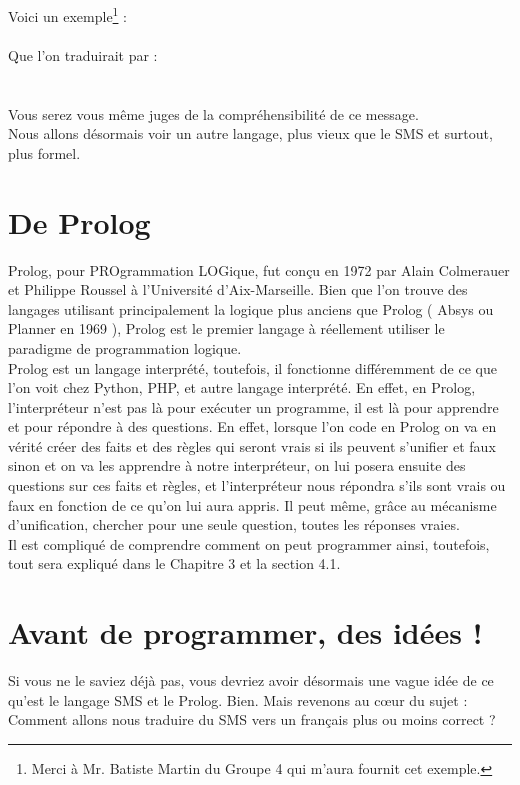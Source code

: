 \documentclass[11pt]{report}
\begin{document}
	Voici un exemple\footnote{Merci à Mr. Batiste Martin du Groupe 4 qui m'aura fournit cet exemple.} : \\
	\\
	Que l'on traduirait par :\\
	\\\\
	Vous serez vous même juges de la compréhensibilité de ce message.\\
	Nous allons désormais voir un autre langage, plus vieux que le SMS et surtout, plus formel.
	
	\section{De Prolog}
	Prolog, pour PROgrammation LOGique, fut conçu en 1972 par Alain Colmerauer et Philippe Roussel à l'Université d'Aix-Marseille. Bien que l'on trouve des langages utilisant principalement la logique plus anciens que Prolog ( Absys ou Planner en 1969 ), Prolog est le premier langage à réellement utiliser le paradigme de programmation logique.\\
	Prolog est un langage interprété, toutefois, il fonctionne différemment de ce que l'on voit chez Python, PHP, et autre langage interprété. En effet, en Prolog, l'interpréteur n'est pas là pour exécuter un programme, il est là pour apprendre et pour répondre à des questions. En effet, lorsque l'on code en Prolog on va en vérité créer des faits et des règles qui seront vrais si ils peuvent s'unifier et faux sinon et on va les apprendre à notre interpréteur, on lui posera ensuite des questions sur ces faits et règles, et l'interpréteur nous répondra s'ils sont vrais ou faux en fonction de ce qu'on lui aura appris. Il peut même, grâce au mécanisme d'unification, chercher pour une seule question, toutes les réponses vraies.\\
	Il est compliqué de comprendre comment on peut programmer ainsi, toutefois, tout sera expliqué dans le Chapitre 3 et la section 4.1.
	
	\section{Avant de programmer, des idées !}
	Si vous ne le saviez déjà pas, vous devriez avoir désormais une vague idée de ce qu'est le langage SMS et le Prolog. Bien. Mais revenons au cœur du sujet : Comment allons nous traduire du SMS vers un français plus ou moins correct ?
\end{document}
